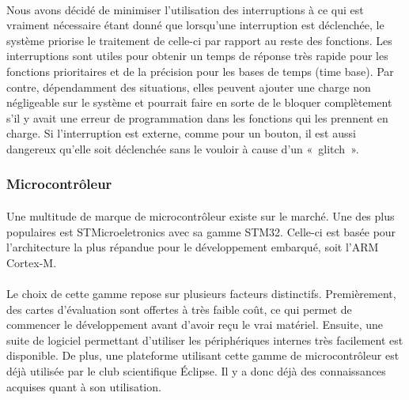 		\paragraph*{}
		Nous avons décidé de minimiser l’utilisation des interruptions à ce qui est vraiment nécessaire étant donné que lorsqu’une interruption est déclenchée, le système priorise le traitement de celle-ci par rapport au reste des fonctions. Les interruptions sont utiles pour obtenir un temps de réponse très rapide pour les fonctions prioritaires et de la précision pour les bases de temps (time base). Par contre, dépendamment des situations, elles peuvent ajouter une charge non négligeable sur le système et pourrait faire en sorte de le bloquer complètement s’il y avait une erreur de programmation dans les fonctions qui les prennent en charge. Si l’interruption est externe, comme pour un bouton, il est aussi dangereux qu’elle soit déclenchée sans le vouloir à cause d’un « glitch ».

	\subsubsection{Microcontrôleur}
		\paragraph*{}
		Une multitude de marque de microcontrôleur existe sur le marché. Une des plus populaires est STMicroeletronics avec sa gamme STM32. Celle-ci est basée pour l’architecture la plus répandue pour le développement embarqué, soit l’ARM Cortex-M.

		\paragraph*{}
		Le choix de cette gamme repose sur plusieurs facteurs distinctifs. Premièrement, des cartes d’évaluation sont offertes à très faible coût, ce qui permet de commencer le développement avant d’avoir reçu le vrai matériel. Ensuite, une suite de logiciel permettant d’utiliser les périphériques internes très facilement est disponible. De plus, une plateforme utilisant cette gamme de microcontrôleur est déjà utilisée par le club scientifique Éclipse. Il y a donc déjà des connaissances acquises quant à son utilisation.
